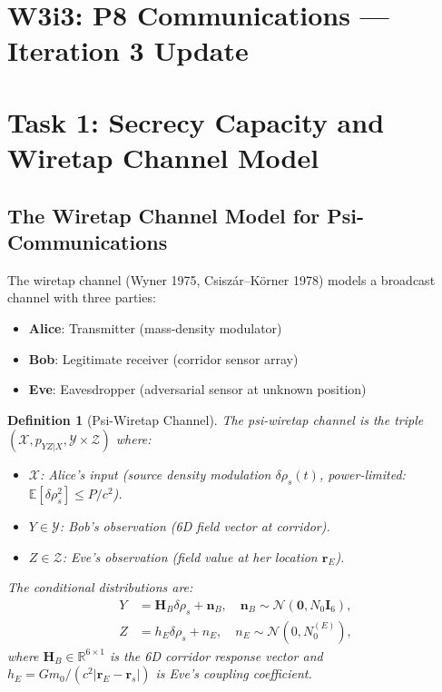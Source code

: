 \documentclass[aps,prd,twocolumn,superscriptaddress,nofootinbib]{revtex4-2}
\newtheorem{definition}{Definition}
\begin{document}
\maketitle
\tableofcontents

\section*{W3i3: P8 Communications --- Iteration 3 Update}

\section{Task 1: Secrecy Capacity and Wiretap Channel Model}
\label{sec:secrecy}

\subsection{The Wiretap Channel Model for Psi-Communications}

The wiretap channel (Wyner 1975, Csisz\'{a}r--K\"{o}rner 1978) models
a broadcast channel with three parties:
\begin{itemize}
\item \textbf{Alice}: Transmitter (mass-density modulator)
\item \textbf{Bob}: Legitimate receiver (corridor sensor array)
\item \textbf{Eve}: Eavesdropper (adversarial sensor at unknown position)
\end{itemize}

\begin{definition}[Psi-Wiretap Channel]
The psi-wiretap channel is the triple
$(\mathcal{X}, p_{YZ|X}, \mathcal{Y}\times\mathcal{Z})$
where:
\begin{itemize}
\item $\mathcal{X}$: Alice's input (source density modulation $\delta\rho_s(t)$,
power-limited: $\mathbb{E}[\delta\rho_s^2] \leq P/c^2$).
\item $Y \in \mathcal{Y}$: Bob's observation (6D field vector at corridor).
\item $Z \in \mathcal{Z}$: Eve's observation (field value at her location $\mathbf{r}_E$).
\end{itemize}
The conditional distributions are:
\begin{align}
Y &= \mathbf{H}_B \delta\rho_s + \mathbf{n}_B, \quad
\mathbf{n}_B \sim \mathcal{N}(\mathbf{0}, N_0 \mathbf{I}_6),
\label{eq:Bob-channel}\\
Z &= h_E \delta\rho_s + n_E, \quad
n_E \sim \mathcal{N}(0, N_0^{(E)}),
\label{eq:Eve-channel}
\end{align}
where $\mathbf{H}_B \in \mathbb{R}^{6 \times 1}$ is the 6D corridor response
vector and $h_E = G m_0 / (c^2 |\mathbf{r}_E - \mathbf{r}_s|)$ is Eve's
coupling coefficient.
\end{definition}
\end{document}
